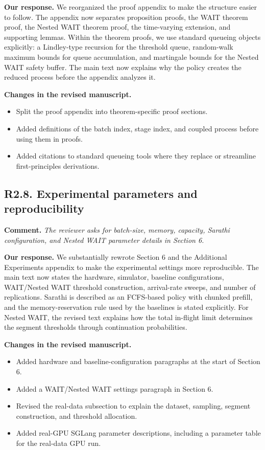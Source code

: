 \documentclass[11pt]{article}
\newcommand{\comment}[1]{%
  \vspace{0.25em}
  \noindent\textbf{Comment.} \emph{#1}
}
\newcommand{\response}{\vspace{0.25em}\noindent\textbf{Our response.} }
\newcommand{\changes}{\vspace{0.25em}\noindent\textbf{Changes in the revised manuscript.} }
\begin{document}
\response We reorganized the proof appendix to make the structure easier to follow. The appendix now separates proposition proofs, the WAIT theorem proof, the Nested WAIT theorem proof, the time-varying extension, and supporting lemmas. Within the theorem proofs, we use standard queueing objects explicitly: a Lindley-type recursion for the threshold queue, random-walk maximum bounds for queue accumulation, and martingale bounds for the Nested WAIT safety buffer. The main text now explains why the policy creates the reduced process before the appendix analyzes it.

\changes
\begin{itemize}
    \item Split the proof appendix into theorem-specific proof sections.
    \item Added definitions of the batch index, stage index, and coupled process before using them in proofs.
    \item Added citations to standard queueing tools where they replace or streamline first-principles derivations.
\end{itemize}

\subsection*{R2.8. Experimental parameters and reproducibility}

\comment{The reviewer asks for batch-size, memory, capacity, Sarathi configuration, and Nested WAIT parameter details in Section 6.}

\response We substantially rewrote Section 6 and the Additional Experiments appendix to make the experimental settings more reproducible. The main text now states the hardware, simulator, baseline configurations, WAIT/Nested WAIT threshold construction, arrival-rate sweeps, and number of replications. Sarathi is described as an FCFS-based policy with chunked prefill, and the memory-reservation rule used by the baselines is stated explicitly. For Nested WAIT, the revised text explains how the total in-flight limit determines the segment thresholds through continuation probabilities.

\changes
\begin{itemize}
    \item Added hardware and baseline-configuration paragraphs at the start of Section 6.
    \item Added a WAIT/Nested WAIT settings paragraph in Section 6.
    \item Revised the real-data subsection to explain the dataset, sampling, segment construction, and threshold allocation.
    \item Added real-GPU SGLang parameter descriptions, including a parameter table for the real-data GPU run.
\end{itemize}
\end{document}
